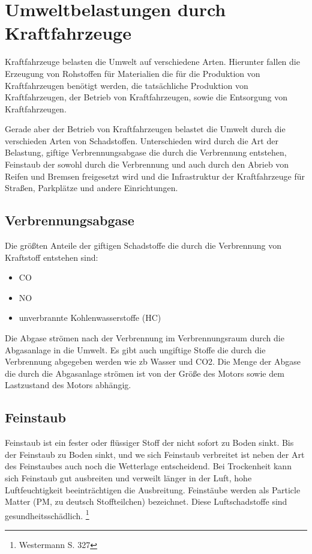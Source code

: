 \section{Umweltbelastungen durch Kraftfahrzeuge}
Kraftfahrzeuge belasten die Umwelt auf verschiedene Arten. Hierunter fallen
die Erzeugung von Rohstoffen für Materialien die für die Produktion von Kraftfahrzeugen benötigt werden,
die tatsächliche Produktion von Kraftfahrzeugen,
der Betrieb von Kraftfahrzeugen,
sowie die Entsorgung von Kraftfahrzeugen.

Gerade aber der Betrieb von Kraftfahrzeugen belastet die Umwelt durch die verschieden Arten von Schadstoffen.
Unterschieden wird durch die Art der Belastung,
giftige Verbrennungsabgase die durch die Verbrennung entstehen,
Feinstaub der sowohl durch die Verbrennung und auch durch den Abrieb von Reifen und Bremsen freigesetzt wird
und die Infrastruktur der Kraftfahrzeuge für Straßen, Parkplätze und andere Einrichtungen.

\subsection{Verbrennungsabgase}
Die größten Anteile der giftigen Schadstoffe die durch die Verbrennung von Kraftstoff entstehen sind:
\begin{itemize}
	\item {\ac{CO}}
	\item {\ac{NO}}
	\item unverbrannte Kohlenwasserstoffe (HC)
\end{itemize}
Die Abgase strömen nach der Verbrennung im Verbrennungsraum durch die Abgasanlage in die Umwelt.
Es gibt auch ungiftige Stoffe die durch die Verbrennung abgegeben werden wie \ac{zb} Wasser und \ac{CO2}.
Die Menge der Abgase die durch die Abgasanlage strömen ist von der Größe des Motors sowie dem Lastzustand des Motors abhängig.

\subsection{Feinstaub}
Feinstaub ist ein fester oder flüssiger Stoff der nicht sofort zu Boden sinkt. Bis der Feinstaub zu Boden sinkt, und we sich Feinstaub verbreitet ist neben der Art des Feinstaubes auch noch die Wetterlage entscheidend.
Bei Trockenheit kann sich Feinstaub gut ausbreiten und verweilt länger in der Luft, hohe Luftfeuchtigkeit beeinträchtigen die Ausbreitung.
Feinstäube werden als Particle Matter (PM, zu deutsch Stoffteilchen) bezeichnet. Diese Luftschadstoffe sind gesundheitsschädlich. \footnote{Westermann S. 327}


